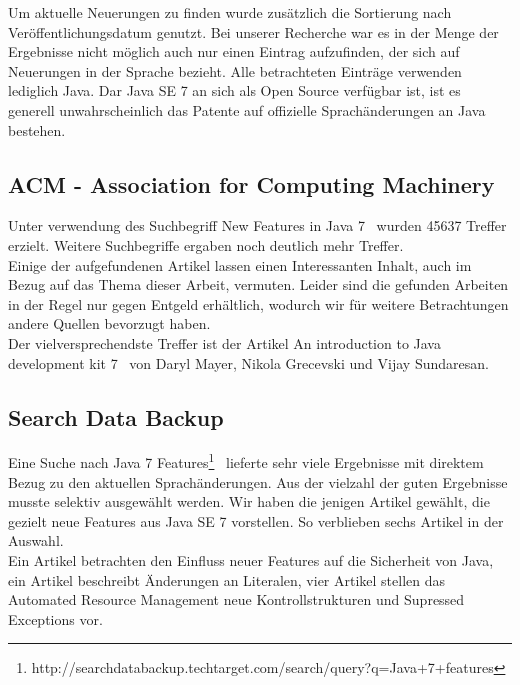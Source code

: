 Um aktuelle Neuerungen zu finden wurde zusätzlich die Sortierung nach Veröffentlichungsdatum genutzt. Bei unserer Recherche war es in der Menge der Ergebnisse nicht möglich auch nur einen Eintrag aufzufinden, der sich auf Neuerungen in der Sprache bezieht. Alle betrachteten Einträge verwenden lediglich Java. Dar Java SE 7 an sich als Open Source verfügbar ist, ist es generell unwahrscheinlich das Patente auf offizielle Sprachänderungen an Java bestehen.\\

\subsection{ACM - Association for Computing Machinery}
Unter verwendung des Suchbegriff \glqq New Features in Java 7 \grqq ~wurden 45637 Treffer erzielt.
Weitere Suchbegriffe ergaben noch deutlich mehr Treffer.\\

Einige der aufgefundenen Artikel lassen einen Interessanten Inhalt, auch im Bezug auf das Thema dieser Arbeit, vermuten. Leider sind die gefunden Arbeiten in der Regel nur gegen Entgeld erhältlich, wodurch wir für weitere Betrachtungen andere Quellen bevorzugt haben.\\

Der vielversprechendste Treffer ist der Artikel \glqq An introduction to Java development kit 7 \grqq\cite{acmJava7} ~von Daryl Mayer, Nikola Grecevski und Vijay Sundaresan.

\subsection{Search Data Backup}
Eine Suche nach \glqq Java 7 Features\grqq\footnote{http://searchdatabackup.techtarget.com/search/query?q=Java+7+features} ~lieferte sehr viele Ergebnisse mit direktem Bezug zu den aktuellen Sprachänderungen. Aus der vielzahl der guten Ergebnisse musste selektiv ausgewählt werden. Wir haben die jenigen Artikel gewählt, die gezielt neue Features aus Java SE 7 vorstellen. So verblieben sechs Artikel in der Auswahl.\\

Ein Artikel\cite{sbJ7ImproveSec} betrachten den Einfluss neuer Features auf die Sicherheit von Java, ein Artikel\cite{sbJ7literals} beschreibt Änderungen an Literalen, vier Artikel stellen das Automated Resource Management\cite{sbJ7resources}\cite{sbJ7coin} neue Kontrollstrukturen\cite{sbJ7switch} und Supressed Exceptions\cite{sbJ7exeptions} vor.

